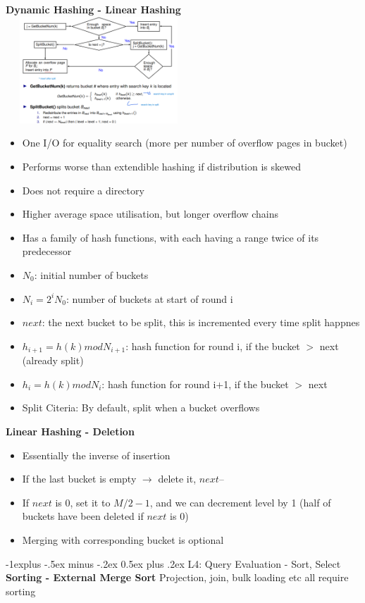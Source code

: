 \documentclass[10pt, landscape]{article}
\makeatletter
\renewcommand{\subsection}{\@startsection{subsection}{2}{0mm}%
                                {-1explus -.5ex minus -.2ex}%
                                {0.5ex plus .2ex}%
                                {\normalfont\normalsize\bfseries}}
\makeatother
\begin{document}
\begin{multicols}{4}
\textbf{Dynamic Hashing - Linear Hashing}
\includegraphics[width=7cm, height=4cm]{linear_hash.png}  
\begin{itemize}
  \item One I/O for equality search (more per number of overflow pages in bucket)
  \item Performs worse than extendible hashing if distribution is skewed
  \item Does not require a directory
  \item Higher average space utilisation, but longer overflow chains
  \item Has a family of hash functions, with each having a range twice of its predecessor
  \item $N_0$: initial number of buckets
  \item $N_i = 2^i N_0$: number of buckets at start of round i
  \item $next$: the next bucket to be split, this is incremented every time split happnes
  \item $h_{i+1}=h(k) mod N_{i+1}$: hash function for round i, if the bucket $>$ next (already split)
  \item $h_{i}=h(k) mod N_{i}$: hash function for round i+1, if the bucket $>$ next
  \item Split Citeria: By default, split when a bucket overflows
\end{itemize}

\textbf{Linear Hashing - Deletion}
\begin{itemize}
  \item Essentially the inverse of insertion
  \item If the last bucket is empty $\rightarrow$ delete it,  $next$--
  \item If $next$ is 0, set it to $M/2 - 1$, and we can decrement level by 1 (half of buckets have been deleted if $next$ is 0)
  \item Merging with corresponding bucket is optional
\end{itemize}

\subsection{L4: Query Evaluation - Sort, Select}
\textbf{Sorting - External Merge Sort}
\newline
Projection, join, bulk loading etc all require sorting


\end{multicols}
\end{document}
